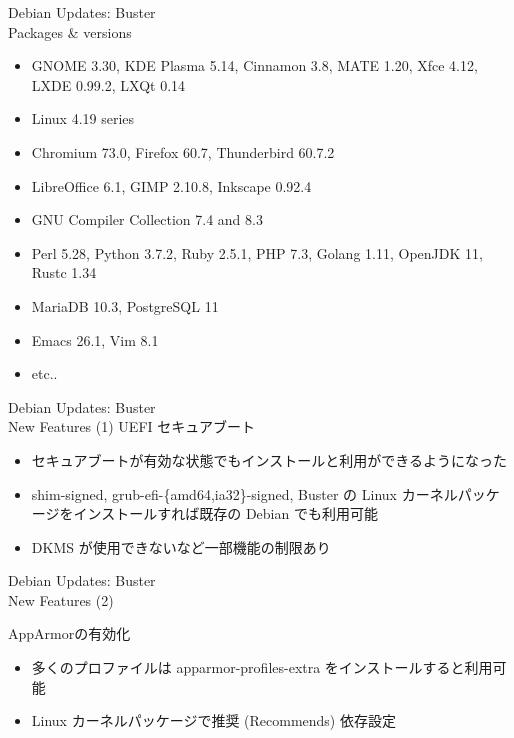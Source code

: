 \documentclass[cjk,c,squeeze,shrink,dvipdfmx,12pt]{beamer}
\begin{document}
\begin{frame}[fragile]{%
    Debian Updates: Buster%
    \\[-.5em]{\normalsize{Packages \& versions}}
  }
  \begin{itemize}
  \item GNOME 3.30, KDE Plasma 5.14, Cinnamon 3.8, MATE 1.20, Xfce 4.12, LXDE 0.99.2, LXQt 0.14
  \item Linux 4.19 series
  \item Chromium 73.0, Firefox 60.7, Thunderbird 60.7.2
  \item LibreOffice 6.1, GIMP 2.10.8, Inkscape 0.92.4
  \item GNU Compiler Collection 7.4 and 8.3
  \item Perl 5.28, Python 3.7.2, Ruby 2.5.1, PHP 7.3, Golang 1.11, OpenJDK 11, Rustc 1.34
  \item MariaDB 10.3, PostgreSQL 11
  \item Emacs 26.1, Vim 8.1
  \item etc..
  \end{itemize}
\end{frame}

\begin{frame}[fragile]{%
    Debian Updates: Buster%
    \\[-.5em]{\normalsize{New Features (1)}}
  }
  UEFI セキュアブート

  \begin{itemize}
  \item セキュアブートが有効な状態でもインストールと利用ができるようになった
  \item shim-signed, grub-efi-\{amd64,ia32\}-signed, Buster の Linux カーネルパッケージをインストールすれば既存の Debian でも利用可能
  \item DKMS が使用できないなど一部機能の制限あり
  \end{itemize}
\end{frame}

\begin{frame}[fragile]{%
    Debian Updates: Buster%
    \\[-.5em]{\normalsize{New Features (2)}}
  }

  AppArmorの有効化

  \begin{itemize}
  \item 多くのプロファイルは apparmor-profiles-extra をインストールすると利用可能
  \item Linux カーネルパッケージで推奨 (Recommends) 依存設定
  \end{itemize}
\end{frame}
\end{document}
